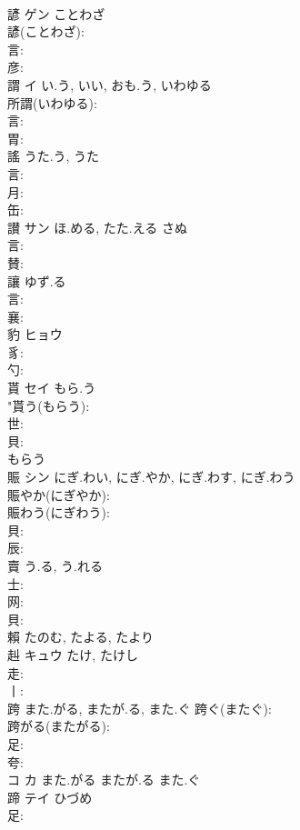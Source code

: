 \documentclass[8pt]{extreport}
\begin{document}
\begin{CJK}{UTF8}{min}
\\	諺	ゲン	ことわざ		
\\	諺(ことわざ): 
\\	言: 
\\	彦: 
\\	謂	イ	い.う, いい, おも.う, いわゆる		
\\	所謂(いわゆる): 
\\	言: 
\\	胃: 
\\	謠		うた.う, うた				
\\	言: 
\\	月: 
\\	缶: 
\\	讃	サン	ほ.める, たた.える	さぬ	
\\	言: 
\\	賛: 
\\	讓		ゆず.る				
\\	言: 
\\	襄: 
\\	豹	ヒョウ			
\\	豸: 
\\	勺: 
\\	貰	セイ	もら.う		
\\	"貰う(もらう): 
\\	世: 
\\	貝: 
\\	もらう 
\\	賑	シン	にぎ.わい, にぎ.やか, にぎ.わす, にぎ.わう		
\\	賑やか(にぎやか): 
\\	賑わう(にぎわう): 
\\	貝: 
\\	辰: 
\\	賣		う.る, う.れる				
\\	士: 
\\	网: 
\\	貝: 
\\	賴		たのむ, たよる, たより				
\\	赳	キュウ		たけ, たけし	
\\	走: 
\\	丨: 
\\	跨		また.がる, またが.る, また.ぐ			跨ぐ(またぐ): 
\\	跨がる(またがる): 
\\	足: 
\\	夸: 
\\	コ カ また.がる またが.る また.ぐ 
\\	蹄	テイ	ひづめ		
\\	足: 

\end{CJK}
\end{document}

